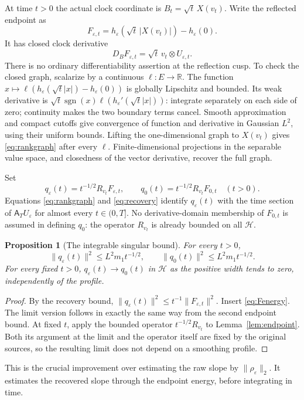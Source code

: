 \documentclass[11pt]{article}
\newtheorem{proposition}[theorem]{Proposition}
\newcommand{\R}{\mathbb R}
\newcommand{\HH}{\mathcal H}
\newcommand{\Reg}{\mathsf A}
\begin{document}
At time $t>0$ the actual clock coordinate is
$B_t=\sqrt t\,X(v_t)$. Write the reflected endpoint as
\[
 F_{\varepsilon,t}
   =h_\varepsilon(\sqrt t\,|X(v_t)|)-h_\varepsilon(0).
\]
It has closed clock derivative
\begin{equation}\label{eq:rankgraph}
 D_BF_{\varepsilon,t}=\sqrt t\,v_t\otimes U_{\varepsilon,t}.
\end{equation}
There is no ordinary differentiability assertion at the reflection
cusp. To check the closed graph, scalarize by a continuous $\ell:E\to\R$.
The function $x\mapsto\ell(h_\varepsilon(\sqrt t|x|)-h_\varepsilon(0))$
is globally Lipschitz and bounded. Its weak derivative is
$\sqrt t\operatorname{sgn}(x)\ell(h_\varepsilon'(\sqrt t|x|))$:
integrate separately on each side of zero; continuity makes the
two boundary terms cancel. Smooth approximation and compact
cutoffs give convergence of function and derivative in Gaussian
$L^2$, using their uniform bounds. Lifting the one-dimensional
graph to $X(v_t)$ gives \eqref{eq:rankgraph} after every $\ell$.
Finite-dimensional projections in the separable value space,
and closedness of the vector derivative, recover the full graph.

Set
\begin{equation}\label{eq:qeps}
 q_\varepsilon(t)=t^{-1/2}R_{v_t}F_{\varepsilon,t},\qquad
 q_0(t)=t^{-1/2}R_{v_t}F_{0,t}\quad(t>0).
\end{equation}
Equations \eqref{eq:rankgraph} and \eqref{eq:recovery} identify
$q_\varepsilon(t)$ with the time section of $\Reg_TU_\varepsilon$
for almost every $t\in(0,T]$. No derivative-domain membership of
$F_{0,t}$ is assumed in defining $q_0$: the operator $R_{v_t}$
is already bounded on all $\HH$.

\begin{proposition}[The integrable singular bound]\label{prop:majorant}
For every $t>0$,
\begin{equation}\label{eq:qbound}
 \|q_\varepsilon(t)\|^2\leq L^2m_1t^{-1/2},\qquad
 \|q_0(t)\|^2\leq L^2m_1t^{-1/2}.
\end{equation}
For every fixed $t>0$, $q_\varepsilon(t)\to q_0(t)$ in $\HH$
as the positive width tends to zero, independently of the profile.
\end{proposition}
\begin{proof}
By the recovery bound,
$\|q_\varepsilon(t)\|^2\leq t^{-1}\|F_{\varepsilon,t}\|^2$.
Insert \eqref{eq:Fenergy}. The limit version follows in exactly
the same way from the second endpoint bound. At fixed $t$, apply
the bounded operator $t^{-1/2}R_{v_t}$ to Lemma~\ref{lem:endpoint}.
Both its argument at the limit and the operator itself are fixed
by the original sources, so the resulting limit does not depend
on a smoothing profile.
\end{proof}
This is the crucial improvement over estimating the raw slope
by $\|\rho_\varepsilon\|_2$. It estimates the recovered slope
through the endpoint energy, before integrating in time.
\end{document}
